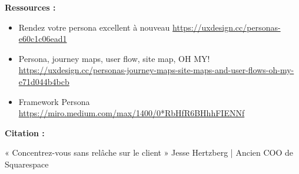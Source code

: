 \textbf{Ressources :}

\begin{itemize}
\item Rendez votre persona excellent à nouveau \url{https://uxdesign.cc/personas-e60c1c06ead1}
\item Persona, journey maps, user flow, site map, OH MY! \url{https://uxdesign.cc/personas-journey-maps-site-maps-and-user-flows-oh-my-e71d044b4bcb}
\item Framework Persona \url{https://miro.medium.com/max/1400/0*RbHfR6BHhhFIENNf}
\end{itemize}

\textbf{Citation :}

« Concentrez-vous sans relâche sur le client » Jesse Hertzberg | Ancien COO de Squarespace

